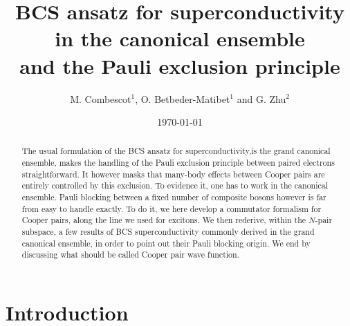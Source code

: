 \documentclass[twocolumn,showpacs]{revtex4}
\begin{document}
\title{\textbf{BCS ansatz for superconductivity in the canonical ensemble\\ and the Pauli exclusion principle}}
\author{M. Combescot$^1$, O. Betbeder-Matibet$^1$ and G. Zhu$^2$}


\begin{abstract}
The usual formulation of the BCS ansatz for superconductivity,is the grand canonical ensemble, makes the handling of the Pauli exclusion principle between paired electrons straightforward. It however masks that many-body effects between Cooper pairs are entirely controlled by this exclusion. To evidence it, one has to work in the canonical ensemble. Pauli blocking between a fixed number of composite bosons however is far from easy to handle exactly. To do it, we here develop a commutator formalism for Cooper pairs, along the line we used for excitons. We then rederive, within the $N$-pair subspace, a few results of BCS superconductivity commonly derived in the grand canonical ensemble, in order to point out their Pauli blocking origin. We end by discussing what should be called Cooper pair wave function.
\end{abstract}

\pacs{}

\date{\today}

\maketitle


\section{Introduction}
\end{document}
